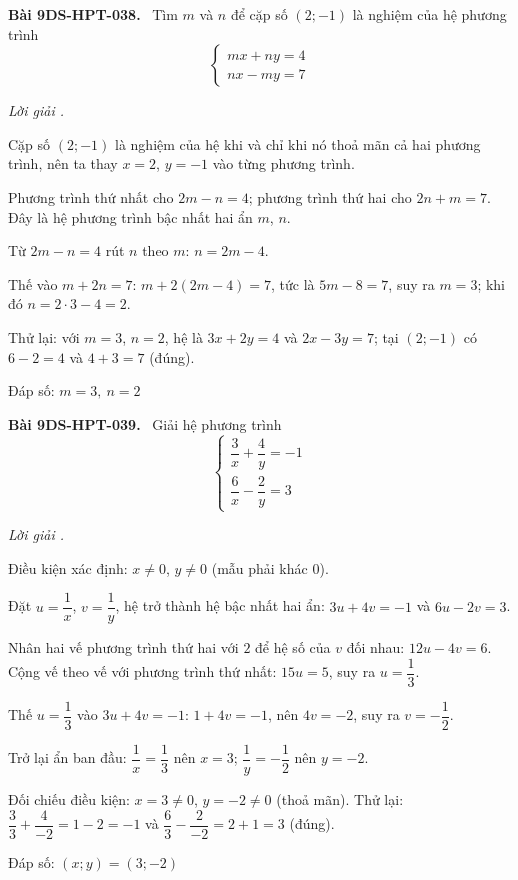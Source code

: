 \documentclass[12pt,a4paper]{article}
\newenvironment{problem}[1][]{\par\medskip\noindent\textbf{Bài #1.}\ }{\par}
\newenvironment{solution}[1][]{\par\noindent\textit{Lời giải #1.}\par}{\par}
\begin{document}
\begin{problem}[9DS-HPT-038]
Tìm $m$ và $n$ để cặp số $(2; -1)$ là nghiệm của hệ phương trình
\[ \begin{cases} mx + ny = 4 \\ nx - my = 7 \end{cases} \]

\begin{solution}
Cặp số $(2; -1)$ là nghiệm của hệ khi và chỉ khi nó thoả mãn cả hai phương trình, nên ta thay $x = 2$, $y = -1$ vào từng phương trình.

Phương trình thứ nhất cho $2m - n = 4$; phương trình thứ hai cho $2n + m = 7$. Đây là hệ phương trình bậc nhất hai ẩn $m$, $n$.

Từ $2m - n = 4$ rút $n$ theo $m$: $n = 2m - 4$.

Thế vào $m + 2n = 7$: $m + 2(2m - 4) = 7$, tức là $5m - 8 = 7$, suy ra $m = 3$; khi đó $n = 2 \cdot 3 - 4 = 2$.

Thử lại: với $m = 3$, $n = 2$, hệ là $3x + 2y = 4$ và $2x - 3y = 7$; tại $(2; -1)$ có $6 - 2 = 4$ và $4 + 3 = 7$ (đúng).

Đáp số: $\boxed{m = 3,\ n = 2}$
\end{solution}
\end{problem}

\begin{problem}[9DS-HPT-039]
Giải hệ phương trình
\[ \begin{cases} \dfrac{3}{x} + \dfrac{4}{y} = -1 \\ \dfrac{6}{x} - \dfrac{2}{y} = 3 \end{cases} \]

\begin{solution}
Điều kiện xác định: $x \neq 0$, $y \neq 0$ (mẫu phải khác $0$).

Đặt $u = \dfrac{1}{x}$, $v = \dfrac{1}{y}$, hệ trở thành hệ bậc nhất hai ẩn: $3u + 4v = -1$ và $6u - 2v = 3$.

Nhân hai vế phương trình thứ hai với $2$ để hệ số của $v$ đối nhau: $12u - 4v = 6$. Cộng vế theo vế với phương trình thứ nhất: $15u = 5$, suy ra $u = \dfrac{1}{3}$.

Thế $u = \dfrac{1}{3}$ vào $3u + 4v = -1$: $1 + 4v = -1$, nên $4v = -2$, suy ra $v = -\dfrac{1}{2}$.

Trở lại ẩn ban đầu: $\dfrac{1}{x} = \dfrac{1}{3}$ nên $x = 3$; $\dfrac{1}{y} = -\dfrac{1}{2}$ nên $y = -2$.

Đối chiếu điều kiện: $x = 3 \neq 0$, $y = -2 \neq 0$ (thoả mãn). Thử lại: $\dfrac{3}{3} + \dfrac{4}{-2} = 1 - 2 = -1$ và $\dfrac{6}{3} - \dfrac{2}{-2} = 2 + 1 = 3$ (đúng).

Đáp số: $\boxed{(x; y) = (3; -2)}$
\end{solution}
\end{problem}
\end{document}
